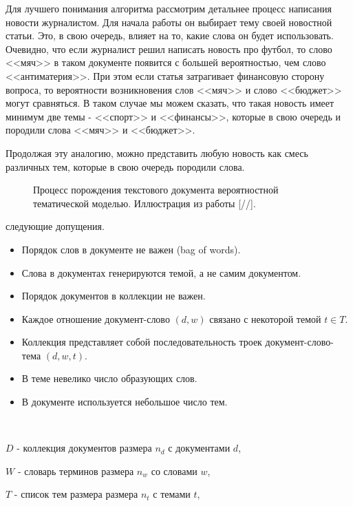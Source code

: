 Для лучшего понимания алгоритма рассмотрим детальнее процесс написания новости журналистом. Для начала работы он выбирает тему своей новостной статьи. Это, в свою очередь, влияет на то, какие слова он будет использовать. Очевидно, что если журналист решил написать новость про футбол, то слово <<мяч>> в таком документе появится с большей вероятностью, чем слово <<антиматерия>>. При этом если статья затрагивает финансовую сторону вопроса, то вероятности возникновения слов <<мяч>> и слово <<бюджет>> могут сравняться. В таком случае мы можем сказать,  что такая новость имеет минимум две темы - <<спорт>> и <<финансы>>, которые в свою очередь и породили слова <<мяч>> и <<бюджет>>. 

Продолжая эту аналогию, можно представить любую новость как смесь различных тем, которые в свою очередь породили слова. 

\begin{figure}[h]
\caption{Процесс порождения текстового документа вероятностной тематической моделью. Иллюстрация из работы [//].}
\label{fig:image}
\end{figure}
\todo{}

 следующие допущения.

\begin{itemize}
    \item Порядок слов в документе не важен (bag of words).
    \item Слова в документах генерируются темой, а не самим документом.
    \item Порядок документов в коллекции не важен.
    \item Каждое отношение документ-слово $(d,w)$ связано с некоторой темой $t \in T$.
    \item Коллекция представляет собой последовательность троек документ-слово-тема $(d,w,t)$.
    \item В теме невелико число образующих слов.
    \item В документе используется небольшое число тем.
\end{itemize}

~\



 $D$ - коллекция документов размера $n_d$ с документами $d$,

 $W$ - словарь терминов размера $n_w$ со словами $w$,

 $T$ - список тем размера размера $n_t$ с темами $t$,

